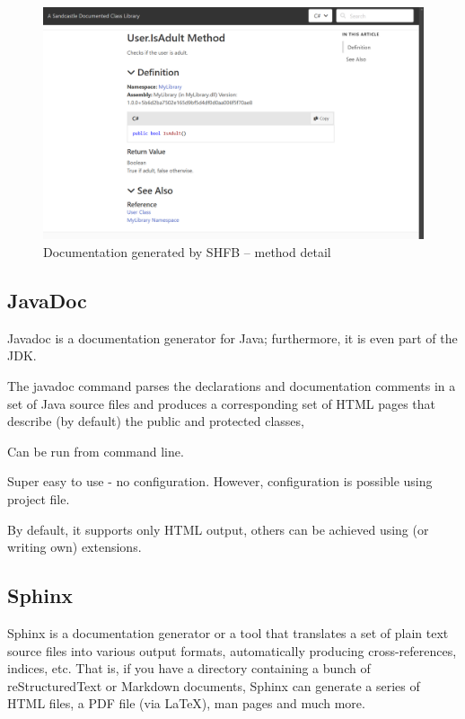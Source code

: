 \begin{figure}
\centering
\includegraphics[width=1\linewidth]{img/sandcastle2.png}
\caption{Documentation generated by SHFB -- method detail}
\label{fig:shfb2}
\end{figure}

\subsection{JavaDoc}

Javadoc is a documentation generator for Java; furthermore, it is even part of the JDK.

The javadoc command parses the declarations and documentation comments in a set of Java source files and produces a corresponding set of HTML pages that describe (by default) the public and protected classes,

Can be run from command line.

Super easy to use - no configuration. 
However, configuration is possible using project file.

By default, it supports only HTML output, others can be achieved using (or writing own) extensions.

\subsection{Sphinx}

Sphinx is a documentation generator or a tool that translates a set of plain text source files into various output formats, automatically producing cross-references, indices, etc. That is, if you have a directory containing a bunch of reStructuredText or Markdown documents, Sphinx can generate a series of HTML files, a PDF file (via LaTeX), man pages and much more.

